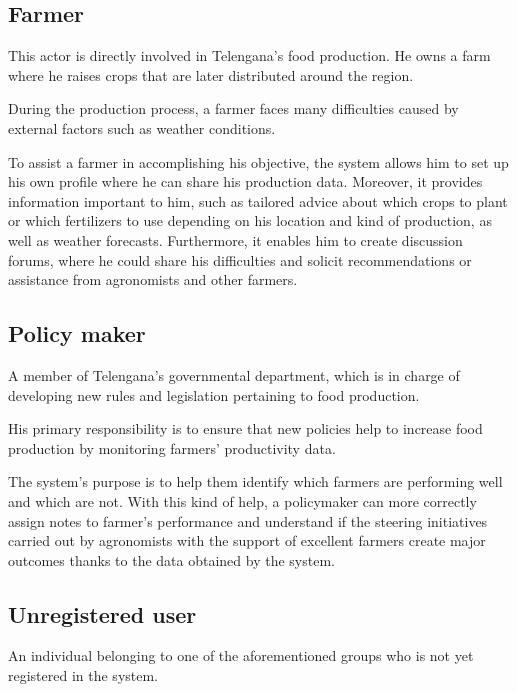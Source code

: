 \subsection{Farmer}

This actor is directly involved in Telengana's food production. He owns a farm where he raises crops that are later distributed around the region.

During the production process, a farmer faces many difficulties caused by external factors such as weather conditions.

To assist a farmer in accomplishing his objective, the system allows him to set up his own profile where he can share his production data. Moreover, it provides information important to him, such as tailored advice about which crops to plant or which fertilizers to use depending on his location and kind of production, as well as weather forecasts. Furthermore, it enables him to create discussion forums, where he could share his difficulties and solicit recommendations or assistance from agronomists and other farmers.

\subsection{Policy maker}

A member of Telengana's governmental department, which is in charge of developing new rules and legislation pertaining to food production.

His primary responsibility is to ensure that new policies help to increase food production by monitoring farmers' productivity data.

The system's purpose is to help them identify which farmers are performing well and which are not. With this kind of help, a policymaker can more correctly assign notes to farmer's performance and understand if the steering initiatives carried out by agronomists with the support of excellent farmers create major outcomes thanks to the data obtained by the system.

\subsection{Unregistered user}

An individual belonging to one of the aforementioned groups who is not yet registered in the system.

